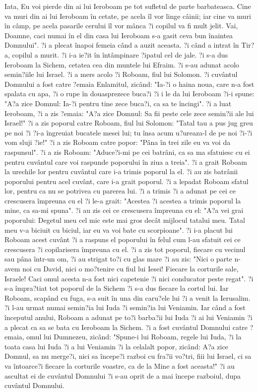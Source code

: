 Iata, Eu voi pierde din ai lui Ieroboam pe tot sufletul de parte barbateasca. Cine va muri din ai lui Ieroboam în cetate, pe acela îl vor linge câinii; iar cine va muri în câmp, pe acela pasarile cerului îl vor mânca ?i copilul va fi mult jelit. Vai, Doamne, caci numai în el din casa lui Ieroboam s-a gasit ceva bun înaintea Domnului". ?i a plecat înapoi femeia când a auzit aceasta. ?i când a intrat în Tir?a, copilul a murit. ?i i-a ie?it în întâmpinare ?ipatul cel de jale. ?i s-a dus Ieroboam la Sichem, cetatea cea din muntele lui Efraim. ?i s-au adunat acolo semin?iile lui Israel. ?i a mers acolo ?i Roboam, fiul lui Solomon. ?i cuvântul Domnului a fost catre ?emaia Enlamitul, zicând: "Ia-?i o haina noua, care n-a fost spalata cu apa, ?i o rupe în douasprezece buca?i ?i i le da lui Ieroboam ?i-i spune: "A?a zice Domnul: Ia-?i pentru tine zece buca?i, ca sa te încingi". ?i a luat Ieroboam, ?i a zis ?emaia: "A?a zice Domnul: Sa fii peste cele zece semin?ii ale lui Israel!" ?i a zis poporul catre Roboam, fiul lui Solomon: "Tatal tau a pus jug greu pe noi ?i ?i-a îngreuiat bucatele mesei lui; tu însa acum u?ureaza-l de pe noi ?i-?i vom sluji ?ie!" ?i a zis Roboam catre popor: "Pâna în trei zile eu va voi da raspunsul". ?i a zis Roboam: "Aduce?i-mi pe cei batrâni, ca sa ma sfatuiesc cu ei pentru cuvântul care voi raspunde poporului în ziua a treia". ?i a grait Roboam la urechile lor pentru cuvântul care i-a trimis poporul la el. ?i au zis batrânii poporului pentru acel cuvânt, care i-a grait poporul. ?i a lepadat Roboam sfatul lor, pentru ca nu se potrivea cu parerea lui. ?i a trimis ?i a adunat pe cei ce crescusera împreuna cu el ?i le-a grait: "Acestea ?i acestea a trimis poporul la mine, ca sa-mi spuna". ?i au zis cei ce crescusera împreuna cu el: "A?a vei grai poporului: Degetul meu cel mic este mai gros decât mijlocul tatalui meu. Tatal meu v-a biciuit cu biciul, iar eu va voi bate cu scorpioane". ?i i-a placut lui Roboam acest cuvânt ?i a raspuns el poporului în felul cum l-au sfatuit cei ce crescusera ?i copilarisera împreuna cu el. ?i a zis tot poporul, fiecare cu vecinul sau pâna într-un om, ?i au strigat to?i cu glas mare ?i au zis: "Nici o parte n-avem noi cu David, nici o mo?tenire cu fiul lui Iesei! Fiecare la corturile sale, Israele! Caci omul acesta n-a fost nici capetenie ?i nici conducator peste regat". ?i s-a împra?tiat tot poporul de la Sichem ?i s-a dus fiecare la cortul lui. Iar Roboam, scapând cu fuga, s-a suit în una din caru?ele lui ?i a venit la Ierusalim. ?i l-au urmat numai semin?ia lui Iuda ?i semin?ia lui Veniamin. Iar când a fost începutul anului, Roboam a adunat pe to?i barba?ii lui Iuda ?i ai lui Veniamin ?i a plecat ca sa se bata cu Ieroboam la Sichem. ?i a fost cuvântul Domnului catre ?emaia, omul lui Dumnezeu, zicând: "Spune-i lui Roboam, regele lui Iuda, ?i la toata casa lui Iuda ?i a lui Veniamin ?i la celalalt popor, zicând: A?a zice Domnul, sa nu merge?i, nici sa începe?i razboi cu fra?ii vo?tri, fiii lui Israel, ci sa va întoarce?i fiecare la corturile voastre, ca de la Mine a fost aceasta!" ?i au ascultat ei de cuvântul Domnului ?i s-au oprit de a mai începe razboiul, dupa cuvântul Domnului.
